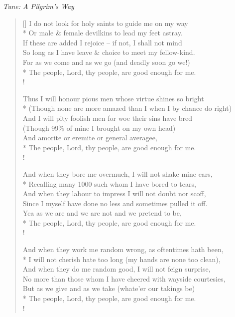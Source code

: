 \documentclass[MAIN]{subfiles}
\begin{document}
\bigskip

\begin{center}
{\it Tune: A Pilgrim's Way}
\end{center}

\bigskip

\settowidth{\versewidth}{(Though none are more amazed than I when I by chance do right)}
\begin{verse}[\versewidth]
I do not look for holy saints to guide me on my way\\*
Or male \& female devilkins to lead my feet astray.\\
If these are added I rejoice -- if not, I shall not mind\\
So long as I have leave \& choice to meet my fellow-kind.\\
For as we come and as we go (and deadly soon go we!)\\*
The people, Lord, thy people, are good enough for me.\\!

Thus I will honour pious men whose virtue shines so bright\\*
(Though none are more amazed than I when I by chance do right)\\
And I will pity foolish men for woe their sins have bred\\
(Though 99\% of mine I brought on my own head)\\
And amorite or eremite or general averagee,\\*
The people, Lord, thy people, are good enough for me.\\!

And when they bore me overmuch, I will not shake mine ears,\\*
Recalling many 1000 such whom I have bored to tears,\\
And when they labour to impress I will not doubt nor scoff,\\
Since I myself have done no less and sometimes pulled it off.\\
Yea as we are and we are not and we pretend to be,\\*
The people, Lord, thy people, are good enough for me.\\!

And when they work me random wrong, as oftentimes hath been,\\*
I will not cherish hate too long (my hands are none too clean),\\
And when they do me random good, I will not feign surprise,\\
No more than those whom I have cheered with wayside courtesies,\\
But as we give and as we take (whate'er our takings be)\\*
The people, Lord, thy people, are good enough for me.\\!


\end{verse}
\end{document}
